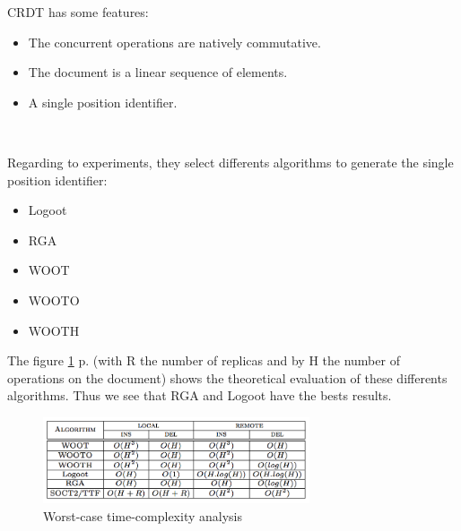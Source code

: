 CRDT has some features:
\begin{itemize}
	\item The concurrent operations are natively commutative.
	\item The document is a linear sequence of elements.
	\item A single position identifier.
\end{itemize}~

Regarding to experiments, they select differents algorithms to generate the single position identifier:
\begin{itemize}
	\item Logoot
	\item RGA
	\item WOOT
	\item WOOTO
	\item WOOTH
\end{itemize}

The figure \ref{fig:worst} p.\pageref{fig:worst} (with R the number of replicas and by H the number of operations on the document) shows the theoretical evaluation of these differents algorithms. Thus we see that RGA and Logoot have the bests results.

\begin{figure}[h]
  \center
  \includegraphics[width=0.7\textwidth]{includes/worst.png}
  \caption{Worst-case time-complexity analysis}
  \label{fig:worst}
\end{figure}